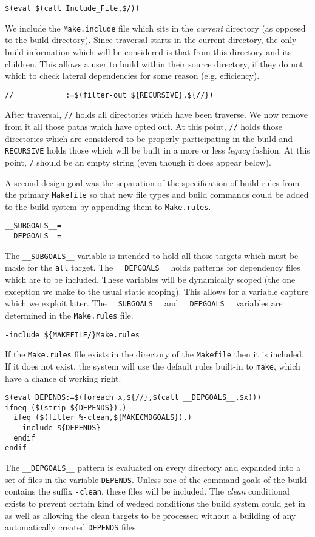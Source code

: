\documentclass{article}
\begin{document}
\begin{verbatim}
$(eval $(call Include_File,$/))
\end{verbatim}
We include the \verb+Make.include+ file which sits in the {\em current}
directory (as opposed to the build directory).  Since traversal
starts in the current directory, the only build information which
will be considered is that from this directory and its children.
This allows a user to build within their source directory, if they
do not which to check lateral dependencies for some reason (e.g.
efficiency).

\begin{verbatim}
//            :=$(filter-out ${RECURSIVE},${//})
\end{verbatim}
After traversal, \verb+//+ holds all directories which have been
traverse.  We now remove from it all those paths which have opted
out.  At this point, \verb+//+ holds those directories which are
considered to be properly participating in the build and
\verb+RECURSIVE+ holds those which will be built in a more or less
{\em legacy} fashion.  At this point, \verb+/+ should be an
empty string (even though it does appear below).

A second design goal was the separation of the specification of
build rules from the primary \verb+Makefile+ so that new file types
and build commands could be added to the build system by appending
them to \verb+Make.rules+.

\begin{verbatim}
__SUBGOALS__=
__DEPGOALS__=
\end{verbatim}
The \verb+__SUBGOALS__+ variable is intended to hold all those targets
which must be made for the \verb+all+ target.  The \verb+__DEPGOALS__+
holds patterns for dependency files which are to be included.
These variables will be
dynamically scoped (the one exception we make to the usual static scoping).
This allows for a variable capture which we exploit later.  The
\verb+__SUBGOALS__+ and \verb+__DEPGOALS__+ variables are
determined in the \verb+Make.rules+
file.

\begin{verbatim}
-include ${MAKEFILE/}Make.rules
\end{verbatim}
If the \verb+Make.rules+ file exists in the directory of the 
\verb+Makefile+ then it is included.  If it does not exist, the system will
use the default rules built-in to \verb+make+, which have a
chance of working right.

\begin{verbatim}
$(eval DEPENDS:=$(foreach x,${//},$(call __DEPGOALS__,$x)))
ifneq ($(strip ${DEPENDS}),)
  ifeq ($(filter %-clean,${MAKECMDGOALS}),)
    include ${DEPENDS}
  endif
endif
\end{verbatim}
The \verb+__DEPGOALS__+ pattern is evaluated on every directory and
expanded into a set of files in the variable \verb+DEPENDS+.  Unless
one of the command goals of the build contains the suffix \verb+-clean+,
these files will be included.  The {\em clean} conditional exists to
prevent certain kind of wedged conditions the build system could get
in as well as allowing the clean targets to be processed without a
building of any automatically created \verb+DEPENDS+ files.
\end{document}
